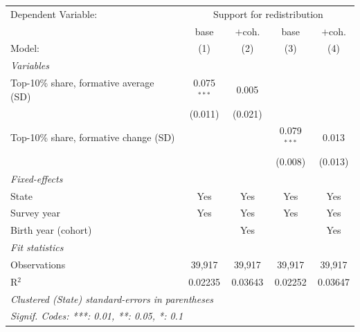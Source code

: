    \begin{tabular}{lcccc}
      \tabularnewline \midrule \midrule
      Dependent Variable: & \multicolumn{4}{c}{Support for redistribution}\\
                                              & base          & $+$coh. & base          & $+$coh. \\   
      Model:                                  & (1)           & (2)     & (3)           & (4)\\  
      \midrule
      \emph{Variables}\\
      Top-10\% share, formative average (SD)  & 0.075$^{***}$ & 0.005   &               &   \\   
                                              & (0.011)       & (0.021) &               &   \\   
      Top-10\% share, formative change (SD)   &               &         & 0.079$^{***}$ & 0.013\\   
                                              &               &         & (0.008)       & (0.013)\\   
      \midrule
      \emph{Fixed-effects}\\
      State                                   & Yes           & Yes     & Yes           & Yes\\  
      Survey year                             & Yes           & Yes     & Yes           & Yes\\  
      Birth year (cohort)                     &               & Yes     &               & Yes\\  
      \midrule
      \emph{Fit statistics}\\
      Observations                            & 39,917        & 39,917  & 39,917        & 39,917\\  
      R$^2$                                   & 0.02235       & 0.03643 & 0.02252       & 0.03647\\  
      \midrule \midrule
      \multicolumn{5}{l}{\emph{Clustered (State) standard-errors in parentheses}}\\
      \multicolumn{5}{l}{\emph{Signif. Codes: ***: 0.01, **: 0.05, *: 0.1}}\\
   \end{tabular}
\vspace{3pt}\par{}
